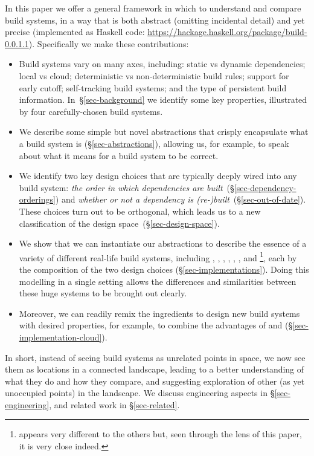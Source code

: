 In this paper we offer a general framework in which to understand and compare
build systems, in a way that is both abstract (omitting incidental detail)
and yet precise (implemented as Haskell code:
\url{https://hackage.haskell.org/package/build-0.0.1.1}). Specifically we make
these contributions:
\begin{itemize}
\item Build systems vary on many axes, including: static vs dynamic
  dependencies; local vs cloud; deterministic vs non-deterministic build rules;
  support for early cutoff; self-tracking build systems; and the type of
  persistent build information. In~\S\ref{sec-background} we identify some key
  properties, illustrated by four carefully-chosen build systems.

\item We describe some simple but novel abstractions that
  crisply encapsulate what a build system is (\S\ref{sec-abstractions}),
  allowing us, for example, to speak about what it means for a build system to be correct.

\item We identify two key design choices that are typically deeply wired into
  any build system: \emph{the order in which dependencies are
  built}~(\S\ref{sec-dependency-orderings}) and \emph{whether or not a
  dependency is (re-)built}~(\S\ref{sec-out-of-date}). These choices turn out to
  be orthogonal, which leads us to a new classification of the design
  space~(\S\ref{sec-design-space}).

\item We show that we can instantiate our abstractions to describe the essence
of a variety of different real-life build systems, including \Make, \Shake,
\Bazel, \CloudBuild, \Buck, \Nix, and \Excel\footnote{\Excel appears very
different to the others but, seen through the lens of this paper, it is very
close indeed.}, each by the composition of the two design choices
(\S\ref{sec-implementations}). Doing this modelling in a single setting
allows the differences and similarities between these huge systems to be
brought out clearly.

\item Moreover, we can readily remix the ingredients to design new build systems
with desired properties, for example, to combine the advantages of \Shake and
\Bazel (\S\ref{sec-implementation-cloud}).

\end{itemize}
In short, instead of seeing build systems as unrelated
points in space, we now see them as locations in a connected landscape,
leading to a better understanding of what they do and how they compare,
and suggesting exploration of other (as yet unoccupied points) in the
landscape.
We discuss engineering aspects in \S\ref{sec-engineering}, and related
work in \S\ref{sec-related}.

